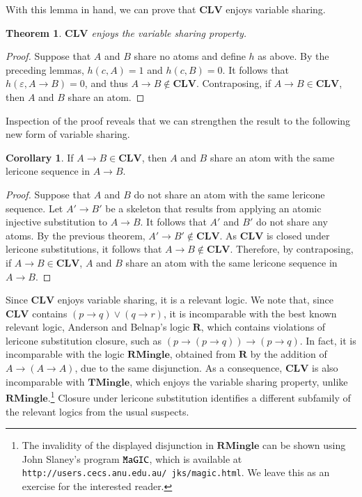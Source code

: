 \documentclass{amsart}
\newtheorem{theorem}{Theorem}
\theoremstyle{definition}
\newtheorem{cor}{Corollary}
\newcommand{\CLV}{\mathbf{CLV}}
\newcommand{\logic}[1]{{\ensuremath {\mathbf{#1}}}}
\begin{document}
With this lemma in hand, we can prove that $\CLV$ enjoys variable sharing. 
\begin{theorem}\label{LRCN_Vs}
    $\CLV$ enjoys the variable sharing property. 
\end{theorem}
\begin{proof}
    Suppose that $A$ and $B$ share no atoms and define $h$ as above. By the preceding lemmas, $h(c,A)=1$ and $h(c,B)=0$. It follows that $h(\varepsilon, A\to B)=0$, and thus $A\to B\not\in\CLV$. Contraposing, if $A\to B\in\CLV$, then $A$ and $B$ share an atom.
\end{proof}
Inspection of the proof reveals that we can strengthen the result to the following new form of variable sharing. 
\begin{cor}
If $A\to B\in \CLV$, then $A$ and $B$ share an atom with the same lericone sequence in $A\to B$.    
\end{cor}
\begin{proof}
Suppose that $A$ and $B$ do not share an atom with the same lericone sequence. Let $A'\to B'$ be a skeleton that results from applying an atomic injective substitution to $A\to B$. It follows that $A'$ and $B'$ do not share any atoms. By the previous theorem, $A'\to B'\not\in\CLV$. As $\CLV$ is closed under lericone substitutions, it follows that $A\to B\not\in \CLV$. Therefore, by contraposing, if $A\to B\in \CLV$, $A$ and $B$ share an atom with the same lericone sequence in $A\to B$.    

\end{proof}
Since $\CLV$ enjoys variable sharing, it is a relevant logic. 
We note that, since  $\CLV$ contains $(p\to q)\lor(q\to r)$, it is incomparable with the best known relevant logic, Anderson and Belnap's logic \logic{R}, which contains violations of lericone substitution closure, such as $(p\to(p\to q))\to(p\to q)$.
In fact, it is incomparable with the logic \logic{RMingle}, obtained from \logic{R} by the addition of $A\to(A\to A)$, due to the same disjunction.
As a consequence, $\CLV$ is also incomparable with $\logic{TMingle}$, which enjoys the variable sharing property, unlike \logic{RMingle}.\footnote{The invalidity of the displayed disjunction in \logic{RMingle} can be shown using John Slaney's program $\tt{MaGIC}$, which is available at {\tt {http://users.cecs.anu.edu.au/~jks/magic.html}}. We leave this as an exercise for the interested reader.} 
Closure under lericone substitution identifies a different subfamily of the relevant logics from the usual suspects. 
\end{document}
